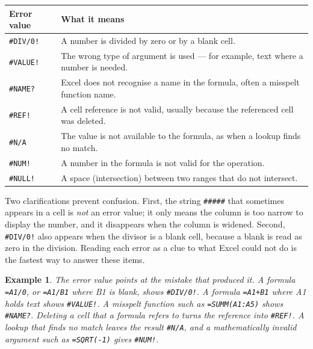 \documentclass[11pt]{article}
\newtheorem{example}{Example}[section]
\begin{document}
\begin{center}
\begin{tabular}{p{}p{}}
\toprule
\textbf{Error value} & \textbf{What it means} \\
\midrule
\texttt{\#DIV/0!} & A number is divided by zero or by a blank cell. \\
\texttt{\#VALUE!} & The wrong type of argument is used --- for example, text where a number is needed. \\
\texttt{\#NAME?} & Excel does not recognise a name in the formula, often a misspelt function name. \\
\texttt{\#REF!} & A cell reference is not valid, usually because the referenced cell was deleted. \\
\texttt{\#N/A} & The value is not available to the formula, as when a lookup finds no match. \\
\texttt{\#NUM!} & A number in the formula is not valid for the operation. \\
\texttt{\#NULL!} & A space (intersection) between two ranges that do not intersect. \\
\bottomrule
\end{tabular}
\end{center}

Two clarifications prevent confusion. First, the string \texttt{\#\#\#\#\#}
that sometimes appears in a cell is \emph{not} an error value; it only means
the column is too narrow to display the number, and it disappears when the
column is widened. Second, \texttt{\#DIV/0!} also appears when the divisor is
a blank cell, because a blank is read as zero in the division. Reading each
error as a clue to what Excel could not do is the fastest way to answer these
items.

\begin{example}
The error value points at the mistake that produced it. A formula
\texttt{=A1/0}, or \texttt{=A1/B1} where B1 is blank, shows
\texttt{\#DIV/0!}. A formula \texttt{=A1+B1} where A1 holds text shows
\texttt{\#VALUE!}. A misspelt function such as \texttt{=SUMM(A1:A5)} shows
\texttt{\#NAME?}. Deleting a cell that a formula refers to turns the reference
into \texttt{\#REF!}. A lookup that finds no match leaves the result
\texttt{\#N/A}, and a mathematically invalid argument such as
\texttt{=SQRT(-1)} gives \texttt{\#NUM!}.
\end{example}
\end{document}

